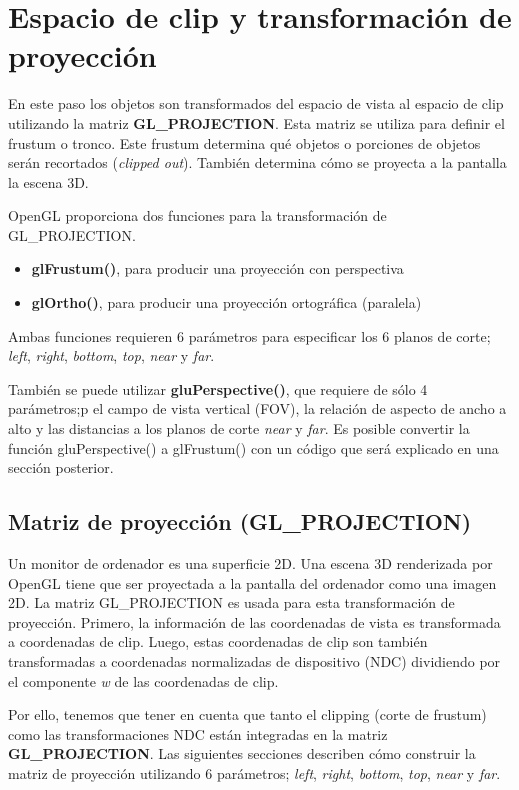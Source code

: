 \chapter{Espacio de clip y transformación de proyección}
En este paso los objetos son transformados del espacio de vista al espacio de clip utilizando la matriz \textbf{GL\_PROJECTION}. Esta matriz se utiliza para definir el frustum o tronco. Este frustum determina qué objetos o porciones de objetos serán recortados (\textit{clipped out}). También determina cómo se proyecta a la pantalla la escena 3D.

OpenGL proporciona dos funciones para la transformación de GL\_PROJECTION.

\begin{itemize}
\item{\textbf{glFrustum()}, para producir una proyección con perspectiva}
\item{\textbf{glOrtho()}, para producir una proyección ortográfica (paralela)}
\end{itemize}

Ambas funciones requieren 6 parámetros para especificar los 6 planos de corte; \textit{left}, \textit{right}, \textit{bottom}, \textit{top}, \textit{near} y \textit{far}.


También se puede utilizar \textbf{gluPerspective()}, que requiere de sólo 4 parámetros;p el campo de vista vertical (FOV), la relación de aspecto de ancho a alto y las distancias a los planos de corte \textit{near} y \textit{far}. Es posible convertir la función gluPerspective() a glFrustum() con un código que será explicado en una sección posterior.

\section{Matriz de proyección (GL\_PROJECTION)}
Un monitor de ordenador es una superficie 2D. Una escena 3D renderizada por OpenGL tiene que ser proyectada a la pantalla del ordenador como una imagen 2D. La matriz GL\_PROJECTION es usada para esta transformación de proyección. Primero, la información de las coordenadas de vista es transformada a coordenadas de clip. Luego, estas coordenadas de clip son también transformadas a coordenadas normalizadas de dispositivo (NDC) dividiendo por el componente \textit{w} de las coordenadas de clip.

Por ello, tenemos que tener en cuenta que tanto el clipping (corte de frustum) como las transformaciones NDC están integradas en la matriz \textbf{GL\_PROJECTION}. Las siguientes secciones describen cómo construir la matriz de proyección utilizando 6 parámetros; \textit{left}, \textit{right}, \textit{bottom}, \textit{top}, \textit{near} y \textit{far}.

